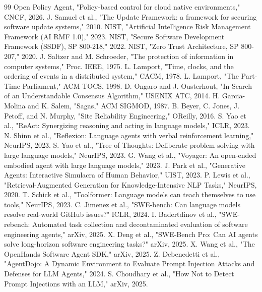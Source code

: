 \documentclass[journal,onecolumn]{IEEEtran}
\begin{document}
\begin{thebibliography}{99}
 Open Policy Agent, "Policy-based control for cloud native environments," CNCF, 2026.
 J. Samuel et al., "The Update Framework: a framework for securing software update systems," 2010.
 NIST, "Artificial Intelligence Risk Management Framework (AI RMF 1.0)," 2023.
 NIST, "Secure Software Development Framework (SSDF), SP 800-218," 2022.
 NIST, "Zero Trust Architecture, SP 800-207," 2020.
 J. Saltzer and M. Schroeder, "The protection of information in computer systems," Proc. IEEE, 1975.
 L. Lamport, "Time, clocks, and the ordering of events in a distributed system," CACM, 1978.
 L. Lamport, "The Part-Time Parliament," ACM TOCS, 1998.
 D. Ongaro and J. Ousterhout, "In Search of an Understandable Consensus Algorithm," USENIX ATC, 2014.
 H. Garcia-Molina and K. Salem, "Sagas," ACM SIGMOD, 1987.
 B. Beyer, C. Jones, J. Petoff, and N. Murphy, "Site Reliability Engineering," OReilly, 2016.
 S. Yao et al., "ReAct: Synergizing reasoning and acting in language models," ICLR, 2023.
 N. Shinn et al., "Reflexion: Language agents with verbal reinforcement learning," NeurIPS, 2023.
 S. Yao et al., "Tree of Thoughts: Deliberate problem solving with large language models," NeurIPS, 2023.
 G. Wang et al., "Voyager: An open-ended embodied agent with large language models," 2023.
 J. Park et al., "Generative Agents: Interactive Simulacra of Human Behavior," UIST, 2023.
 P. Lewis et al., "Retrieval-Augmented Generation for Knowledge-Intensive NLP Tasks," NeurIPS, 2020.
 T. Schick et al., "Toolformer: Language models can teach themselves to use tools," NeurIPS, 2023.
 C. Jimenez et al., "SWE-bench: Can language models resolve real-world GitHub issues?" ICLR, 2024.
 I. Badertdinov et al., "SWE-rebench: Automated task collection and decontaminated evaluation of software engineering agents," arXiv, 2025.
 X. Deng et al., "SWE-Bench Pro: Can AI agents solve long-horizon software engineering tasks?" arXiv, 2025.
 X. Wang et al., "The OpenHands Software Agent SDK," arXiv, 2025.
 Z. Debenedetti et al., "AgentDojo: A Dynamic Environment to Evaluate Prompt Injection Attacks and Defenses for LLM Agents," 2024.
 S. Choudhary et al., "How Not to Detect Prompt Injections with an LLM," arXiv, 2025.

\end{thebibliography}
\end{document}
